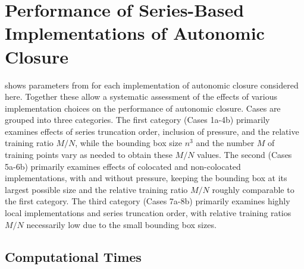 \graphicspath{ {./Ch5/}  } 

%




%

\chapter{Performance of  Series-Based Implementations of Autonomic Closure}
\label{ch:5}

 shows parameters from  for each implementation of autonomic closure considered here. Together these allow a systematic assessment of the effects of various implementation choices on the performance of autonomic closure. Cases are grouped into three categories. The first category (Cases 1a-4b) primarily examines effects of series truncation order, inclusion of pressure, and the relative training ratio $M/N$, while the bounding box size $n^3$ and the number $M$ of training points vary as needed to obtain these  $M/N$ values. The second (Cases 5a-6b) primarily examines effects of colocated and non-colocated implementations, with and without pressure, keeping the bounding box at its largest possible size and the relative training ratio  $M/N$ roughly comparable to the first category. The third category (Cases 7a-8b) primarily examines highly local implementations and series truncation order, with relative training ratios $M/N$  necessarily low due to the small bounding box sizes. 

\section{Computational Times} 
\label{sec:IVA}

